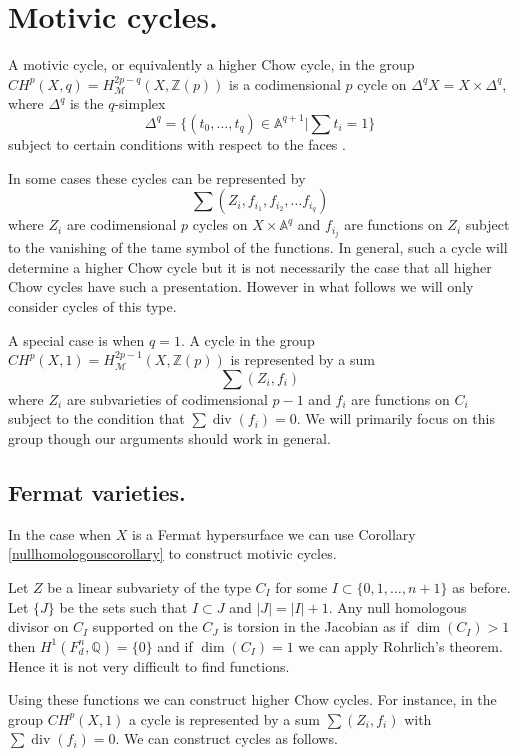 \documentclass[12pt,reqno]{article}
\newcommand {\ZZ}{{\mathds Z}}
\newcommand {\Q}{{\mathds Q}}
\newcommand {\M}{{\mathcal M}}
\newcommand {\AB}{{\mathds A}}
\def\div{\operatorname{div}}
\def\dim{\operatorname{dim}}
\begin{document}
\section{Motivic cycles.}
 

A motivic cycle, or equivalently a higher Chow cycle, in the group $CH^p(X,q)=H^{2p-q}_{\M}(X,\ZZ(p))$ is  a codimensional $p$ cycle on $\Delta^q X=X \times \Delta^q$, where $\Delta^q$ is the $q$-simplex 
%
$$\Delta^q=\{(t_0,\dots,t_q) \in \AB^{q+1}| \sum t_i=1\}$$ 
%
subject to certain conditions with respect to the faces \cite{blocACKT,scho}. 


In some cases these cycles  can be represented by 
%
$$\sum (Z_i,f_{i_1},f_{i_2},\dots f_{i_q})$$ 
%
where $Z_i$ are codimensional $p$ cycles on $X \times \AB^q$ and $f_{i_j}$ are functions on $Z_i$ subject to the vanishing of the tame symbol of the functions.  In general, such a cycle will determine a higher Chow cycle but it is not necessarily the case that all higher Chow cycles have such a presentation. However in what follows we will only consider cycles of this type. 


A special case is when $q=1$. A cycle in the group $CH^p(X,1)=H^{2p-1}_{\M}(X,\ZZ(p))$ is represented by a sum 
%
$$\sum (Z_i,f_i)$$
%
where $Z_i$ are subvarieties of codimensional $p-1$ and $f_i$ are functions on $C_i$ subject to the condition that $\sum \div(f_i)=0$.  We will primarily focus on this group though our arguments should work in general. 

\subsection{Fermat varieties.}

In the case when $X$ is a Fermat hypersurface we can use Corollary \ref{nullhomologouscorollary} to construct  motivic cycles.  

Let  $Z$ be a linear subvariety of the type $C_I$ for some $I \subset \{0,1,\dots,n+1\}$ as before. Let $\{J\}$ be the sets such that $I \subset J$ and  $|J|=|I|+1$. Any null homologous divisor on $C_I$ supported  on the $C_J$ is torsion in the Jacobian as if $\dim(C_I)>1$ then $H^1(F^n_d,\Q)=\{0\}$ and if $\dim(C_I)=1$ we can apply Rohrlich's theorem. Hence it is not very difficult to find functions. 

Using these functions we can construct higher Chow cycles. For instance, in the group $CH^p(X,1)$ a cycle is represented by a sum $\sum (Z_i,f_i)$ with $\sum \div(f_i)=0$. We can construct cycles as follows.
\end{document}
